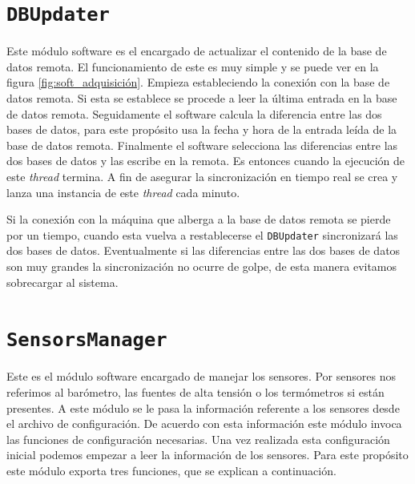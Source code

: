     \section{\texttt{DBUpdater}}
        Este módulo software es el encargado de actualizar el contenido de la
        base de datos remota. El funcionamiento de este es muy simple y se
        puede ver en la figura \ref{fig:soft_adquisición}. Empieza
        estableciendo la conexión con la base de datos remota. Si esta se
        establece se procede a leer la última entrada en la base de datos
        remota. Seguidamente el software calcula la diferencia entre las dos
        bases de datos, para este propósito usa la fecha y hora de la entrada
        leída de la base de datos remota. Finalmente el software selecciona las
        diferencias entre las dos bases de datos y las escribe en la remota. Es
        entonces cuando la ejecución de este \emph{thread} termina.  A fin de
        asegurar la sincronización en tiempo real se crea y lanza una instancia
        de este \emph{thread} cada minuto.
        \par
        Si la conexión con la máquina que alberga a la base de datos remota se
        pierde por un tiempo, cuando esta vuelva a restablecerse el
        \texttt{DBUpdater} sincronizará las dos bases de datos. Eventualmente
        si las diferencias entre las dos bases de datos son muy grandes la
        sincronización no ocurre de golpe, de esta manera evitamos sobrecargar
        al sistema.

    \section{\texttt{SensorsManager}}
        Este es el módulo software encargado de manejar los sensores. Por
        sensores nos referimos al barómetro, las fuentes de alta tensión o los
        termómetros si están presentes. A este módulo se le pasa la información
        referente a los sensores desde el archivo de configuración. De acuerdo
        con esta información este módulo invoca las funciones de configuración
        necesarias. Una vez realizada esta configuración inicial podemos
        empezar a leer la información de los sensores. Para este propósito este
        módulo exporta tres funciones, que se explican a continuación.
